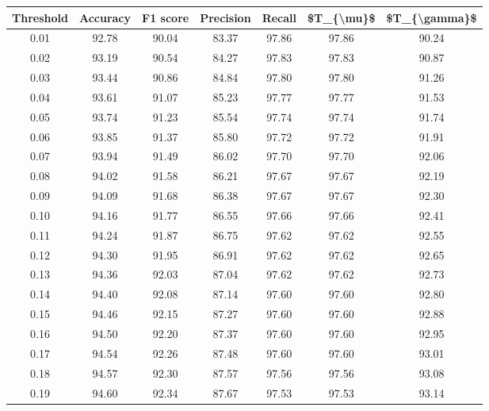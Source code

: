 \begin{tabular}{|c|c|c|c|c|c|c|}
\hline
 Threshold &  Accuracy &  F1 score &  Precision &  Recall &  \$T\_\{\textbackslash mu\}\$ &  \$T\_\{\textbackslash gamma\}\$ \\
\hline
      0.01 &     92.78 &     90.04 &      83.37 &   97.86 &      97.86 &         90.24 \\
      0.02 &     93.19 &     90.54 &      84.27 &   97.83 &      97.83 &         90.87 \\
      0.03 &     93.44 &     90.86 &      84.84 &   97.80 &      97.80 &         91.26 \\
      0.04 &     93.61 &     91.07 &      85.23 &   97.77 &      97.77 &         91.53 \\
      0.05 &     93.74 &     91.23 &      85.54 &   97.74 &      97.74 &         91.74 \\
      0.06 &     93.85 &     91.37 &      85.80 &   97.72 &      97.72 &         91.91 \\
      0.07 &     93.94 &     91.49 &      86.02 &   97.70 &      97.70 &         92.06 \\
      0.08 &     94.02 &     91.58 &      86.21 &   97.67 &      97.67 &         92.19 \\
      0.09 &     94.09 &     91.68 &      86.38 &   97.67 &      97.67 &         92.30 \\
      0.10 &     94.16 &     91.77 &      86.55 &   97.66 &      97.66 &         92.41 \\
      0.11 &     94.24 &     91.87 &      86.75 &   97.62 &      97.62 &         92.55 \\
      0.12 &     94.30 &     91.95 &      86.91 &   97.62 &      97.62 &         92.65 \\
      0.13 &     94.36 &     92.03 &      87.04 &   97.62 &      97.62 &         92.73 \\
      0.14 &     94.40 &     92.08 &      87.14 &   97.60 &      97.60 &         92.80 \\
      0.15 &     94.46 &     92.15 &      87.27 &   97.60 &      97.60 &         92.88 \\
      0.16 &     94.50 &     92.20 &      87.37 &   97.60 &      97.60 &         92.95 \\
      0.17 &     94.54 &     92.26 &      87.48 &   97.60 &      97.60 &         93.01 \\
      0.18 &     94.57 &     92.30 &      87.57 &   97.56 &      97.56 &         93.08 \\
      0.19 &     94.60 &     92.34 &      87.67 &   97.53 &      97.53 &         93.14 \\

\end{tabular}
